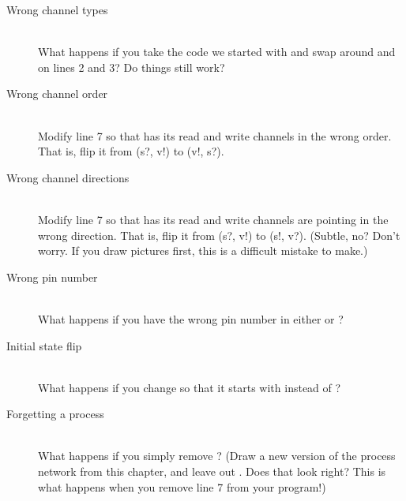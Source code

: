 \begin{description}
	\item[Wrong channel types]\ \\
	What happens if you take the code we started with and swap around \SIGNALT and \LEVELT on lines 2 and 3? Do things still work?
	\item[Wrong channel order]\ \\
	Modify line 7 so that \toggle has its read and write channels in the wrong order. That is, flip it from {\code (s?, v!)} to {\code (v!, s?)}.
	\item[Wrong channel directions]\ \\
		Modify line 7 so that \toggle has its read and write channels are pointing in the wrong direction. That is, flip it from {\code (s?, v!)} to {\code (s!, v?)}. (Subtle, no? Don't worry. If you draw pictures first, this is a difficult mistake to make.)
  \item[Wrong pin number]\ \\
	What happens if you have the wrong pin number in either \bp or \digo?
	\item[Initial state flip]\ \\
	What happens if you change \digo so that it starts with \HIGH instead of \LOW?
	\item[Forgetting a process]\ \\
	What happens if you simply remove \toggle? (Draw a new version of the process network from this chapter, and leave out \toggle. Does that look right? This is what happens when you remove line 7 from your program!)
\end{description}	



